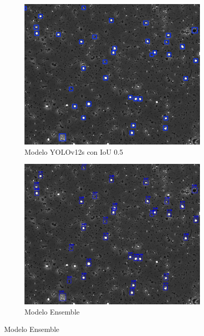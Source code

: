 \documentclass[12pt,a4paper,onecolumn,oneside]{report}
\begin{document}
\begin{figure}[H]
  \vspace{0.3cm} 
  
  \begin{subfigure}[b]{0.48\textwidth}
    \centering
    \includegraphics[width=\textwidth]{figuras/evaluacion_cualitativa/142/142_v12.jpg}
    \caption{Modelo YOLOv12s con IoU 0.5}
    \label{fig:yolov12s_IoU0.5_image_142}
  \end{subfigure}
  \hfill
  \begin{subfigure}[b]{0.48\textwidth}
    \centering
    \includegraphics[width=\textwidth]{figuras/evaluacion_cualitativa/142/142_ensemble.jpg}
    \caption{Modelo Ensemble}
    \label{fig:ensemble_image_142}
  \end{subfigure}
  

\end{figure}
\end{document}
